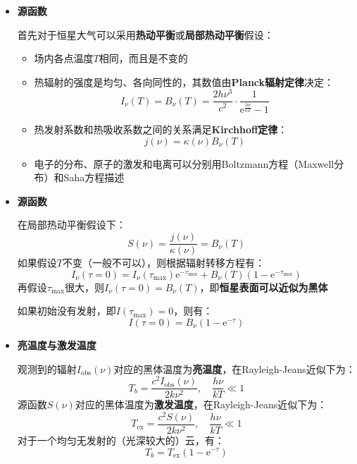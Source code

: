 \documentclass{beamer}
\newenvironment{slide}{
    \begin{frame}{\bfseries{\sectiontitle}}
}{
    \end{frame}
}
\begin{document}
\begin{slide}
    \begin{itemize}
        \item \textbf{源函数}

        首先对于恒星大气可以采用\textbf{热动平衡}或\textbf{局部热动平衡}假设：
        \begin{itemize}
            \item 场内各点温度$T$相同，而且是不变的

            \item 热辐射的强度是均匀、各向同性的，其数值由\textbf{Planck辐射定律}决定：
            \[
                \boxed{
                I_\nu(T) = B_\nu(T) = \frac{2h\nu^3}{c^2}\cdot\frac{1}{\mathrm{e}^{\tfrac{h\nu}{kT}}-1}
                }
            \]

            \item 热发射系数和热吸收系数之间的关系满足\textbf{Kirchhoff定律}：
            \[
                \boxed{
                j(\nu) = \kappa(\nu)B_\nu(T)
                }
            \]

            \item 电子的分布、原子的激发和电离可以分别用Boltzmann方程（Maxwell分布）和Saha方程描述
        \end{itemize}
    \end{itemize}
\end{slide}

\begin{slide}
    \begin{itemize}
        \item \textbf{源函数}

        在局部热动平衡假设下：
        \[
            S(\nu) = \frac{j(\nu)}{\kappa(\nu)} = B_\nu(T)
        \]
        如果假设$T$不变（一般不可以），则根据辐射转移方程有：
        \[
            I_\nu(\tau=0) = I_\nu(\tau_{\mathrm{max}})\mathrm{e}^{-\tau_{\mathrm{max}}} + B_\nu(T)(1-\mathrm{e}^{-\tau_{\mathrm{max}}})
        \]
        再假设$\tau_{\mathrm{max}}$很大，则$I_\nu(\tau=0)=B_\nu(T)$，即\textbf{恒星表面可以近似为黑体}

        如果初始没有发射，即$I(\tau_{\mathrm{max}})=0$，则有：
        \[
            I(\tau=0) = B_\nu(1-\mathrm{e}^{-\tau})
        \]
    \end{itemize}
\end{slide}

\begin{slide}
    \begin{itemize}
        \item \textbf{亮温度与激发温度}

        观测到的辐射$I_{\mathrm{obs}}(\nu)$对应的黑体温度为\textbf{亮温度}，在Rayleigh-Jeans近似下为：
        \[
            T_b = \frac{c^2I_{\mathrm{obs}}(\nu)}{2k\nu^2},\quad \frac{h\nu}{kT} \ll 1
        \]
        源函数$S(\nu)$对应的黑体温度为\textbf{激发温度}，在Rayleigh-Jeans近似下为：
        \[
            T_{\mathrm{ex}} = \frac{c^2S(\nu)}{2k\nu^2},\quad \frac{h\nu}{kT} \ll 1
        \]
        对于一个均匀无发射的（光深较大的）云，有：
        \[
            T_b = T_{\mathrm{ex}}(1-\mathrm{e}^{-\tau})
        \]
    \end{itemize}
\end{slide}
\end{document}
